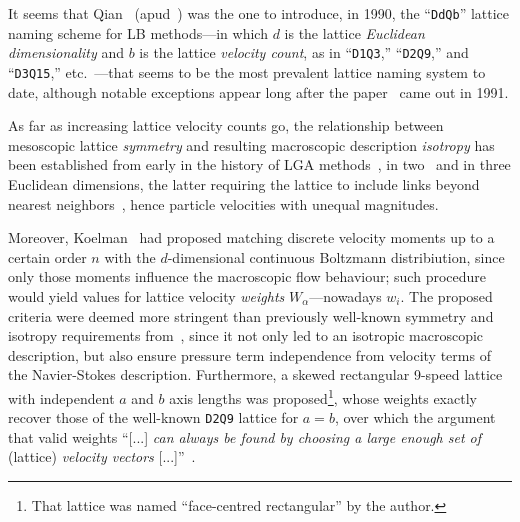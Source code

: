     It seems that Qian~\cite{1990-QianYH-Paris} (apud~\cite[p.~235]{1993-QianYH-JSciComput}) was the one to introduce, in  1990,
    the ``\texttt{DdQb}'' lattice naming scheme for LB methods---in which $d$ is the lattice \emph{Euclidean dimensionality} and
    $b$  is  the  lattice  \emph{velocity  count},  as  in   ``\texttt{D1Q3},''   ``\texttt{D2Q9},''   and   ``\texttt{D3Q15},''
    etc.~\cite{1992-QianYH+LallemandP-EurophysLett}---that seems to be  the  most  prevalent  lattice  naming  system  to  date,
    although notable exceptions appear long after the paper~\cite{1991-QianYH+LallemandP-AdvKinTheoContMech} came out in 1991.

    As far as increasing lattice velocity counts go, the relationship between mesoscopic lattice \emph{symmetry}  and  resulting
    macroscopic   description   \emph{isotropy}   has   been   established    from    early    in    the    history    of    LGA
    methods~\cite{1973-HardyJ+PazzisO-JMathPhys, 1976-HardyJ+PomeauY-PhysRevA},  in  two~\cite{1986-FrischU+PomeauY-PhysRevLett}
    and  in  three  Euclidean   dimensions,   the   latter   requiring   the   lattice   to   include   links   beyond   nearest
    neighbors~\cite[pp.~473,490]{1986-WolframS-JStatPhys}, hence particle velocities with unequal magnitudes.

    Moreover, Koelman~\cite{1991-KoelmanJMVA-EurophysLett} had proposed matching discrete velocity moments up to a certain order
    $n$ with the $d$-dimensional continuous Boltzmann distribiution, since only those moments  influence  the  macroscopic  flow
    behaviour; such procedure would yield values for lattice velocity \emph{weights} $W_{\alpha}$---nowadays $w_i$. The proposed
    criteria   were   deemed   more   stringent   than   previously    well-known    symmetry    and    isotropy    requirements
    from~\cite{1986-WolframS-JStatPhys}, since it not only led to an isotropic macroscopic description, but also ensure pressure
    term independence from velocity terms of the Navier-Stokes description. Furthermore, a skewed  rectangular  9-speed  lattice
    with independent $a$ and $b$ axis lengths was proposed\footnote{That lattice was named ``face-centred rectangular''  by  the
    author.}, whose weights exactly recover those of the well-known \texttt{D2Q9} lattice for $a = b$, over which  the  argument
    that valid weights ``[...] \emph{can always be found by choosing a large enough set of} (lattice) \emph{velocity  vectors\/}
    [...]''~\cite{1991-KoelmanJMVA-EurophysLett}.

